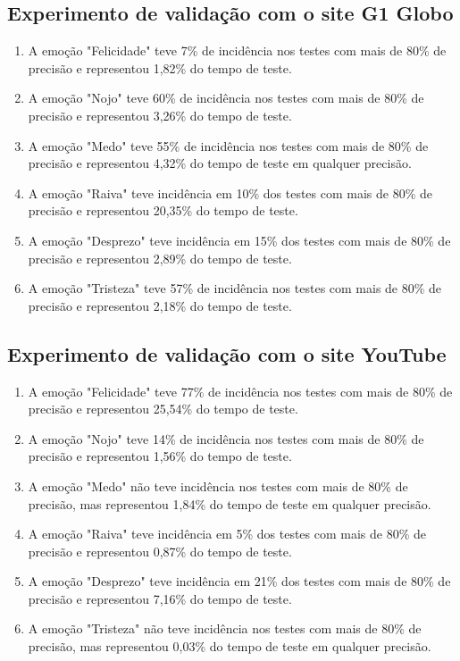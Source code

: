 \subsection{Experimento de validação com o site G1 Globo \cite{19}}

\begin{enumerate}
  \item A emoção "Felicidade" teve 7\% de incidência nos testes com mais de 80\% de precisão e representou 1,82\% do tempo de teste.
  \item A emoção "Nojo" teve 60\% de incidência nos testes com mais de 80\% de precisão e representou 3,26\% do tempo de teste.
  \item A emoção "Medo" teve 55\% de incidência nos testes com mais de 80\% de precisão e representou 4,32\% do tempo de teste em qualquer precisão.
  \item A emoção "Raiva" teve incidência em 10\% dos testes com mais de 80\% de precisão e representou 20,35\% do tempo de teste.
  \item A emoção "Desprezo" teve incidência em 15\% dos testes com mais de 80\% de precisão e representou 2,89\% do tempo de teste.
  \item A emoção "Tristeza" teve 57\% de incidência nos testes com mais de 80\% de precisão e representou 2,18\% do tempo de teste.
\end{enumerate}

\subsection{Experimento de validação com o site YouTube \cite{20}}

\begin{enumerate}
  \item A emoção "Felicidade" teve 77\% de incidência nos testes com mais de 80\% de precisão e representou 25,54\% do tempo de teste.
  \item A emoção "Nojo" teve 14\% de incidência nos testes com mais de 80\% de precisão e representou 1,56\% do tempo de teste.
  \item A emoção "Medo" não teve incidência nos testes com mais de 80\% de precisão, mas representou 1,84\% do tempo de teste em qualquer precisão.
  \item A emoção "Raiva" teve incidência em 5\% dos testes com mais de 80\% de precisão e representou 0,87\% do tempo de teste.
  \item A emoção "Desprezo" teve incidência em 21\% dos testes com mais de 80\% de precisão e representou 7,16\% do tempo de teste.
  \item A emoção "Tristeza" não teve incidência nos testes com mais de 80\% de precisão, mas representou 0,03\% do tempo de teste em qualquer precisão.
\end{enumerate}

